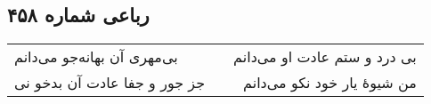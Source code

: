 \begin{center}
\section*{رباعی شماره ۴۵۸}
\label{sec:sh458}
\begin{longtable}{l p{0.5cm} r}
بی‌مهری آن بهانه‌جو می‌دانم
&&
بی درد و ستم عادت او می‌دانم
\\
جز جور و جفا عادت آن بدخو نی
&&
من شیوهٔ یار خود نکو می‌دانم
\\
\end{longtable}
\end{center}
